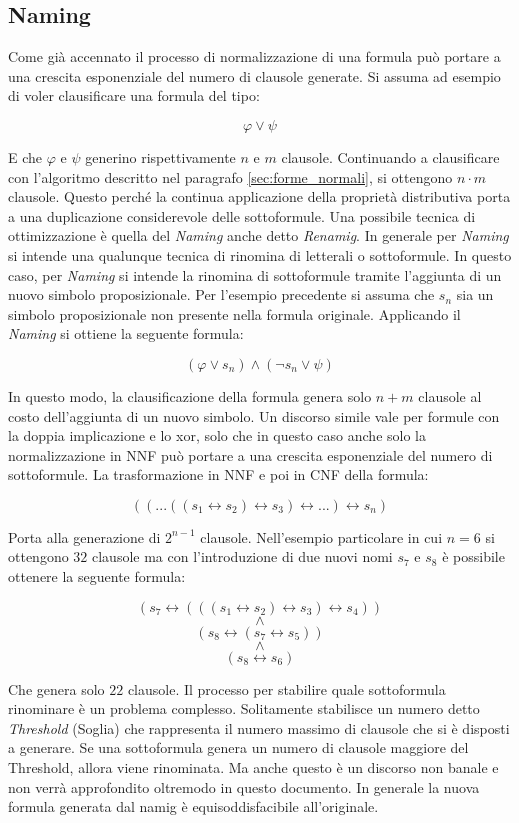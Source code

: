 \documentclass[./main.tex]{subfiles}
\begin{document}
\subsection{Naming} \label{sec:naming}
Come già accennato il processo di normalizzazione di una formula può portare a una crescita esponenziale del numero di clausole generate.
Si assuma ad esempio di voler clausificare una formula del tipo:

$$ \varphi \lor \psi$$

E che $\varphi$ e $\psi$ generino rispettivamente $n$ e $m$ clausole. Continuando a clausificare con l'algoritmo 
descritto nel paragrafo \ref{sec:forme_normali}, si ottengono $n \cdot m$ clausole. 
Questo perché la continua applicazione della proprietà distributiva porta a una duplicazione considerevole delle sottoformule.
Una possibile tecnica di ottimizzazione è quella del \textit{Naming} \cite{naming} anche detto \textit{Renamig}.
In generale per \textit{Naming} si intende una qualunque tecnica di rinomina di letterali o sottoformule.
In questo caso, per \textit{Naming} si intende la rinomina di sottoformule tramite l'aggiunta di un nuovo simbolo proposizionale.
Per l'esempio precedente si assuma che $s_n$ sia un simbolo proposizionale non presente nella formula originale.
Applicando il \textit{Naming} si ottiene la seguente formula:

$$ (\varphi \lor s_n) \land (\lnot s_n \lor \psi)$$

In questo modo, la clausificazione della formula genera solo $n + m$ clausole al costo dell'aggiunta di un nuovo simbolo.
Un discorso simile vale per formule con la doppia implicazione e lo xor, solo che in questo caso
anche solo la normalizzazione in NNF può portare a una crescita esponenziale del numero di sottoformule.
La trasformazione in NNF e poi in CNF della formula:

$$ ((...((s_1 \leftrightarrow s_2) \leftrightarrow s_3) \leftrightarrow ...) \leftrightarrow s_n)$$

Porta alla generazione di $2^{n-1}$ clausole. Nell'esempio particolare in cui $n=6$ si ottengono $32$ clausole ma con l'introduzione 
di due nuovi nomi $s_7$ e $s_8$ è possibile ottenere la seguente formula:

$$ (s_7 \leftrightarrow (((s_1 \leftrightarrow s_2) \leftrightarrow s_3) \leftrightarrow s_4)) $$
$$ \land $$
$$ (s_8 \leftrightarrow (s_7 \leftrightarrow s_5)) $$
$$ \land $$
$$ (s_8 \leftrightarrow s_6) $$

Che genera solo $22$ clausole.
Il processo per stabilire quale sottoformula rinominare è un problema complesso. 
Solitamente stabilisce un numero detto \textit{Threshold} (Soglia) che rappresenta il numero massimo di clausole che si è disposti a generare.
Se una sottoformula genera un numero di clausole maggiore del Threshold, allora viene rinominata. 
Ma anche questo è un discorso non banale e non verrà approfondito oltremodo in questo documento.
In generale la nuova formula generata dal namig è equisoddisfacibile all'originale.
\end{document}

